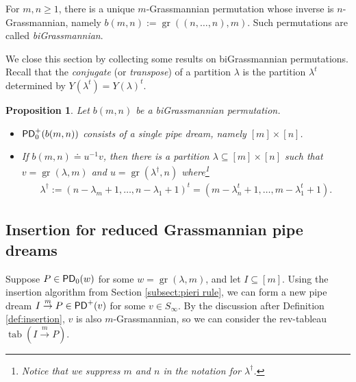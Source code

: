 \documentclass[11pt,reqno]{amsart} %
\newcommand{\sseq}{\subseteq}
\newcommand{\msert}{\overset{m}{\rightarrow}}
\DeclareMathOperator{\Grass}{gr}
\DeclareMathOperator{\PD}{\sf{PD}}
\DeclareMathOperator{\tab}{tab}
\newtheorem{proposition}[theorem]{Proposition}
\theoremstyle{definition}
\begin{document}
For $m,n\geq 1$, there is a unique $m$-Grassmannian permutation whose inverse is $n$-Grassmannian, namely $b(m,n) := \Grass((n,\dots,n),m)$.
Such permutations are called \textit{biGrassmannian}.

We close this section by collecting some results on biGrassmannian permutations.
Recall that the \textit{conjugate} (or \textit{transpose}) of a partition $\lambda$ is the partition $\lambda^t$ determined by $Y(\lambda^t) = Y(\lambda)^t$.

\begin{proposition}
\label{prop:bigrassmannian}
Let $b(m,n)$ be a biGrassmannian permutation.
\begin{itemize}
\item[(i)]
$\PD_0^+(b(m,n))$ consists of a single pipe dream, namely $[m]\times [n]$.
\item[(ii)]
If $b(m,n) \doteq u^{-1}v$, then there is a partition $\lambda\sseq [m]\times [n]$ such that $v = \Grass(\lambda,m)$ and $u = \Grass(\lambda^\dagger,n)$ where\footnote{
    Notice that we suppress $m$ and $n$ in the notation for $\lambda^\dagger$.
} \begin{align*}
    \lambda^\dagger 
    := (n-\lambda_m+1,\dots,n-\lambda_1+1)^t
    = (m-\lambda^t_n+1,\dots,m-\lambda^t_1+1).
\end{align*}
\end{itemize}
\end{proposition}





\subsection{Insertion for reduced Grassmannian pipe dreams}

Suppose $P\in \PD_0(w)$ for some $w = \Grass(\lambda,m)$, and let $I\sseq [m]$.
Using the insertion algorithm from Section \ref{subsect:pieri rule}, we can form a new pipe dream $I\msert P\in \PD^+(v)$ for some $v\in S_\infty$.
By the discussion after Definition \ref{def:insertion}, $v$ is also $m$-Grassmannian, so we can consider the rev-tableau $\tab(I\msert P)$.
\end{document}
